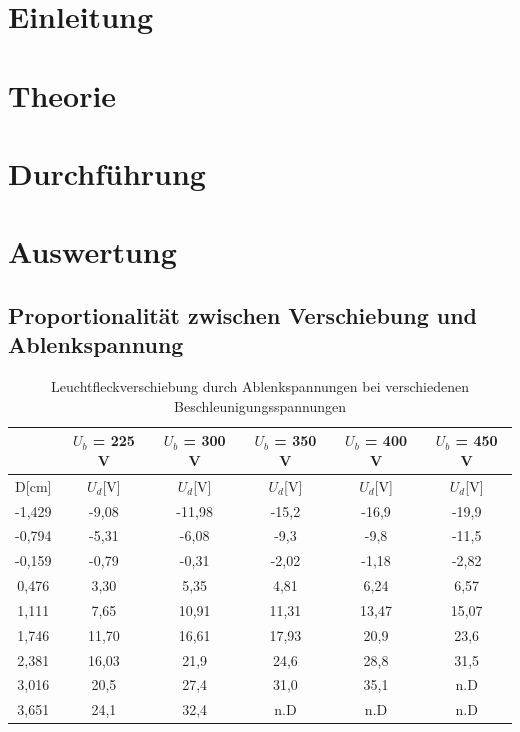 
\section{Einleitung}				%

\section{Theorie}

\section{Durchführung}

\section{Auswertung}

\subsection{Proportionalität zwischen Verschiebung und Ablenkspannung}

\renewcommand{\arraystretch}{1.5}
\begin{table}[h]
\begin{tabular}{c|ccccc}
\centering
  & $U_b$ = 225 V &  $U_b$ = 300 V &  $U_b$ = 350 V &  $U_b$ = 400 V &  $U_b$ = 450 V\\
 \hline
 D[cm] & $U_d$[V] & $U_d$[V] & $U_d$[V] & $U_d$[V] & $U_d$[V]\\
 \hline
-1,429	&-9,08	&-11,98	&-15,2	&-16,9&	-19,9\\
-0,794	&-5,31	&-6,08	&-9,3	&-9,8&	-11,5\\
-0,159	&-0,79	&-0,31	&-2,02	&-1,18&	-2,82\\
0,476	&3,30	&5,35	&4,81	&6,24&	6,57\\
1,111	&7,65	&10,91	&11,31	&13,47&	15,07\\
1,746	&11,70	&16,61	&17,93	&20,9	&23,6\\
2,381	&16,03	&21,9	&24,6	&28,8	&31,5\\
3,016	&20,5	&27,4	&31,0	&35,1	&n.D\\
3,651	&24,1	&32,4	&n.D	&n.D	&n.D\\
 \end{tabular}
\label{PropUD}
\centering
\caption{Leuchtfleckverschiebung durch Ablenkspannungen bei verschiedenen Beschleunigungsspannungen}
\end{table}
\renewcommand{\arraystretch}{1}

